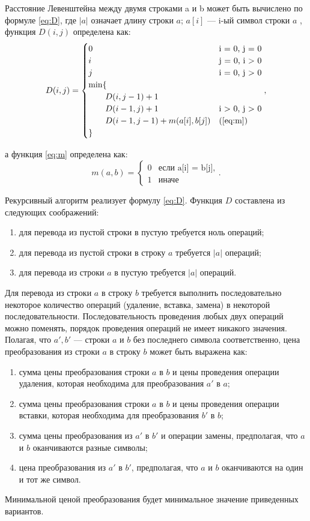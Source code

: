 Расстояние Левенштейна между двумя строками a и b может быть вычислено по формуле \ref{eq:D}, где $|a|$ означает длину строки $a$; $a[i]$ — i-ый символ строки $a$ , функция $D(i, j)$ определена как:
\begin{equation}
	\label{eq:D}
	D(i, j) = \begin{cases}
		0 &\text{i = 0, j = 0}\\
		i &\text{j = 0, i > 0}\\
		j &\text{i = 0, j > 0}\\
		\min \lbrace \\
			\qquad D(i, j-1) + 1\\
			\qquad D(i-1, j) + 1 &\text{i > 0, j > 0}\\
			\qquad D(i-1, j-1) + m(a[i], b[j]) &\text(\ref{eq:m})\\
		\rbrace
	\end{cases},
\end{equation}

а функция \ref{eq:m} определена как:
\begin{equation}
	\label{eq:m}
	m(a, b) = \begin{cases}
		0 &\text{если a[i] = b[j],}\\
		1 &\text{иначе}
	\end{cases}.
\end{equation}

Рекурсивный алгоритм реализует формулу \ref{eq:D}.
Функция $D$ составлена из следующих соображений:
\begin{enumerate}[label={\arabic*)}]
	\item для перевода из пустой строки в пустую требуется ноль операций;
	\item для перевода из пустой строки в строку $a$ требуется $|a|$ операций;
	\item для перевода из строки $a$ в пустую требуется $|a|$ операций.
\end{enumerate}
Для перевода из строки $a$ в строку $b$ требуется выполнить последовательно некоторое количество операций (удаление, вставка, замена) в некоторой последовательности. Последовательность проведения любых двух операций можно поменять, порядок проведения операций не имеет никакого значения. Полагая, что $a', b'$  — строки $a$ и $b$ без последнего символа соответственно, цена преобразования из строки $a$ в строку $b$ может быть выражена как:
	\begin{enumerate}[label={\arabic*)}]
		\item сумма цены преобразования строки $a$ в $b$ и цены проведения операции удаления, которая необходима для преобразования $a'$ в $a$;
		\item сумма цены преобразования строки $a$ в $b$  и цены проведения операции вставки, которая необходима для преобразования $b'$ в $b$;
		\item сумма цены преобразования из $a'$ в $b'$ и операции замены, предполагая, что $a$ и $b$ оканчиваются разные символы;
		\item цена преобразования из $a'$ в $b'$, предполагая, что $a$ и $b$ оканчиваются на один и тот же символ.
	\end{enumerate}
Минимальной ценой преобразования будет минимальное значение приведенных вариантов.

